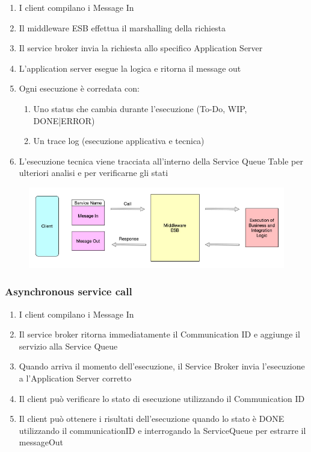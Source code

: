 \documentclass{article}
\begin{document}
\begin{enumerate}
    \item I client compilano i Message In
    \item Il middleware ESB effettua il marshalling della richiesta
    \item Il service broker invia la richiesta allo specifico Application Server
    \item L'application server esegue la logica e ritorna il message out
    \item Ogni esecuzione è corredata con:
    \begin{enumerate}
        \item Uno status che cambia durante l'esecuzione (To-Do, WIP, DONE|ERROR)
        \item Un trace log (esecuzione applicativa e tecnica)
    \end{enumerate}
    \item L'esecuzione tecnica viene tracciata all'interno della Service Queue Table per ulteriori analisi e per verificarne gli stati
\end{enumerate}

\begin{figure}[htp]
    \centering
    \includegraphics[width=\linewidth]{fig/synchronous_service_call.png}
    \label{fig:Synchronous service call}
\end{figure}

\subsubsection{Asynchronous service call}
\begin{enumerate}
    \item I client compilano i Message In
    \item Il service broker ritorna immediatamente il Communication ID e aggiunge il servizio alla Service Queue
    \item Quando arriva il momento dell'esecuzione, il Service Broker invia l'esecuzione a l'Application Server corretto
    \item Il client può verificare lo stato di esecuzione utilizzando il Communication ID
    \item Il client può ottenere i risultati dell'esecuzione quando lo stato è DONE utilizzando il communicationID e interrogando la ServiceQueue per estrarre il messageOut
\end{enumerate}
\end{document}
